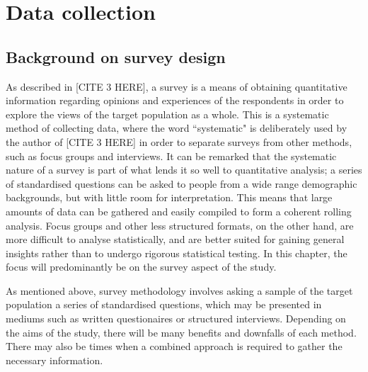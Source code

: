 
\chapter{Data collection}

\section{Background on survey design}




As described in [CITE 3 HERE], a survey is a means of obtaining quantitative information regarding opinions and 
experiences of the respondents in order to explore the views of the target population as a whole. This is a systematic
method of collecting data, where the word ``systematic" is deliberately used by the author of [CITE 3 HERE] in order to separate
surveys from other methods, such as focus groups and interviews. It can be remarked that the systematic nature of
a survey is part of what lends it so well to quantitative analysis; a series of standardised questions can be asked to people
from a wide range demographic backgrounds, but with little room for interpretation. This means that large amounts of data can be 
gathered and easily compiled to form a coherent rolling analysis. Focus groups and other less structured formats, on the other hand, 
are more difficult to analyse statistically, and are better suited for gaining general insights rather than to undergo rigorous statistical 
testing. In this chapter, the focus will predominantly be on the survey aspect of the study.

As mentioned above, survey methodology involves asking a sample of the target population a series of standardised questions, 
which may be presented in mediums such as written questionaires or structured interviews. Depending on the aims of the study, there
will be many benefits and downfalls of each method. There may also be times when a combined approach is required to
gather the necessary information.


